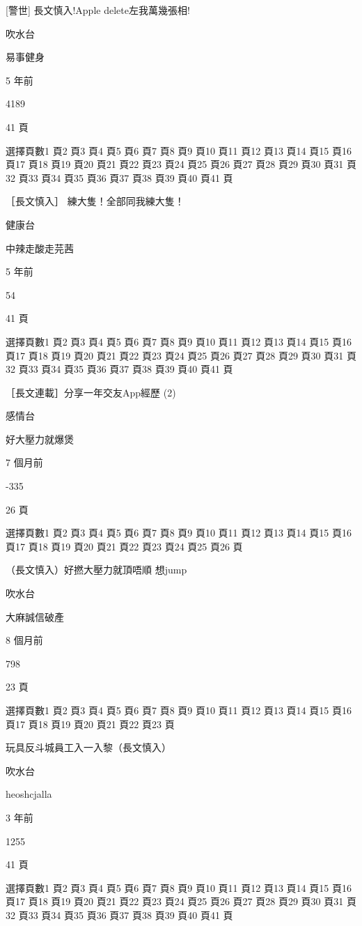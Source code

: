 [警世] 長文慎入!Apple delete左我萬幾張相!

吹水台

易事健身

5 年前

4189

41 頁

選擇頁數1 頁2 頁3 頁4 頁5 頁6 頁7 頁8 頁9 頁10 頁11 頁12 頁13 頁14 頁15 頁16 頁17 頁18 頁19 頁20 頁21 頁22 頁23 頁24 頁25 頁26 頁27 頁28 頁29 頁30 頁31 頁32 頁33 頁34 頁35 頁36 頁37 頁38 頁39 頁40 頁41 頁

［長文慎入］ 練大隻！全部同我練大隻！

健康台

中辣走酸走芫茜

5 年前

54

41 頁

選擇頁數1 頁2 頁3 頁4 頁5 頁6 頁7 頁8 頁9 頁10 頁11 頁12 頁13 頁14 頁15 頁16 頁17 頁18 頁19 頁20 頁21 頁22 頁23 頁24 頁25 頁26 頁27 頁28 頁29 頁30 頁31 頁32 頁33 頁34 頁35 頁36 頁37 頁38 頁39 頁40 頁41 頁

［長文連載］分享一年交友App經歷 (2)

感情台

好大壓力就爆煲

7 個月前

-335

26 頁

選擇頁數1 頁2 頁3 頁4 頁5 頁6 頁7 頁8 頁9 頁10 頁11 頁12 頁13 頁14 頁15 頁16 頁17 頁18 頁19 頁20 頁21 頁22 頁23 頁24 頁25 頁26 頁

（長文慎入）好撚大壓力就頂唔順 想jump

吹水台

大麻誠信破產

8 個月前

798

23 頁

選擇頁數1 頁2 頁3 頁4 頁5 頁6 頁7 頁8 頁9 頁10 頁11 頁12 頁13 頁14 頁15 頁16 頁17 頁18 頁19 頁20 頁21 頁22 頁23 頁

玩具反斗城員工入一入黎（長文慎入）

吹水台

heoshcjalla

3 年前

1255

41 頁

選擇頁數1 頁2 頁3 頁4 頁5 頁6 頁7 頁8 頁9 頁10 頁11 頁12 頁13 頁14 頁15 頁16 頁17 頁18 頁19 頁20 頁21 頁22 頁23 頁24 頁25 頁26 頁27 頁28 頁29 頁30 頁31 頁32 頁33 頁34 頁35 頁36 頁37 頁38 頁39 頁40 頁41 頁


